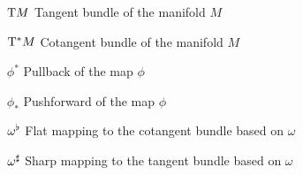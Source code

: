 \begin{itemize}[itemsep=0pt, leftmargin=2cm, labelsep=0cm, labelwidth=1.9cm, align=left]
    \item[$\mathrm{T}M$]  Tangent bundle of the manifold $M$
    \item[$\mathrm{T}^*M$]  Cotangent bundle of the manifold $M$
    \item[$\phi^*$]  Pullback of the map $\phi$
    \item[$\phi_*$]  Pushforward of the map $\phi$
    \item[$\omega^\flat$]  Flat mapping to the cotangent bundle  based on $\omega$
    \item[$\omega^\sharp$]  Sharp mapping to the tangent bundle based on $\omega$
\end{itemize}